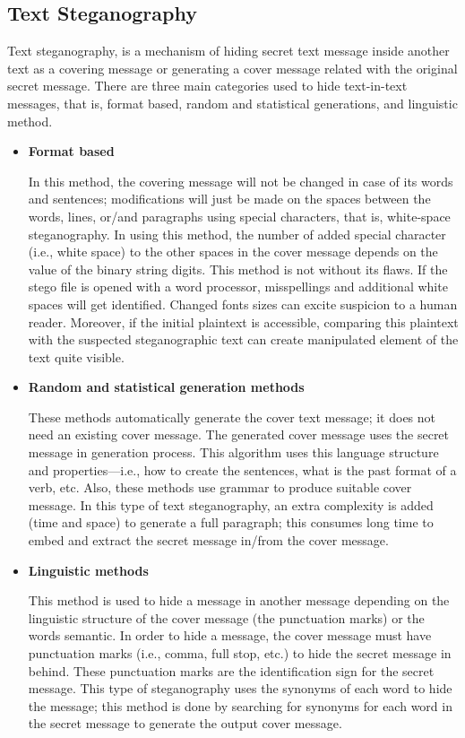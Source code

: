 \documentclass[journal,onecolumn]{IEEEtran}
\begin{document}
\subsection{Text Steganography}
Text steganography, is a mechanism of hiding secret text message inside another text as a covering message or generating a cover message related with the original secret message. There are three main categories used to hide text-in-text messages, that is, format based, random and statistical generations, and linguistic method\cite{prasad2011new,bennett2004linguistic}.
\begin{itemize}
	\item \textbf{Format based}
	 
	In this method, the covering message will not be changed in case of its words and sentences; modifications will just be made on the spaces between the words, lines, or/and paragraphs using special characters, that is, white-space steganography. In using this method, the number of added special character (i.e., white space) to the other spaces in the cover message depends on the value of the binary string digits. This method is not without its flaws. If the stego file is opened with a word processor, misspellings and additional white spaces will get identified. Changed fonts sizes can excite suspicion to a human reader. Moreover, if the initial plaintext is accessible, comparing this plaintext with the suspected steganographic text can create manipulated element of the text quite visible.
	\item \textbf{Random and statistical generation methods}
	
	These methods automatically generate the cover text message; it does not need an existing cover message. The generated cover message uses the secret message in generation process. This algorithm uses this language structure and properties—i.e., how to create the sentences, what is the past format of a verb, etc. Also, these methods use grammar to produce suitable cover message. In this type of text steganography, an extra complexity is added (time and space) to generate a full paragraph; this consumes long time to embed and extract the secret message in/from the cover message\cite{hamdan2016ah4s}.
	\item \textbf{Linguistic methods}
	
	This method is used to hide a message in another message depending on the linguistic structure of the cover message (the punctuation marks) or the words semantic. In order to hide a message, the cover message must have punctuation marks (i.e., comma, full stop, etc.) to hide the secret message in behind. These punctuation marks are the identification sign for the secret message. This type of steganography uses the synonyms of each word to hide the message; this method is done by searching for synonyms for each word in the secret message to generate the output cover message\cite{hamdan2016ah4s}.
\end{itemize}
\end{document}
